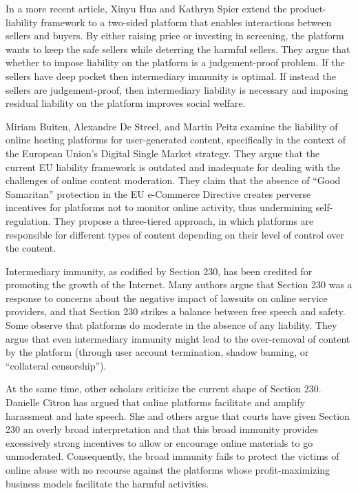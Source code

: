 In a more recent article, Xinyu Hua and Kathryn Spier extend the product-liability framework to a two-sided platform that enables interactions between sellers and buyers. By either raising price or investing in screening, the platform wants to keep the safe sellers while deterring the harmful sellers. They argue that whether to impose liability on the platform is a judgement-proof problem. If the sellers have deep pocket then intermediary immunity is optimal. If instead the sellers are judgement-proof, then intermediary liability is necessary and imposing residual liability on the platform improves social welfare.


Miriam Buiten, Alexandre De Streel, and Martin Peitz examine the liability of online hosting platforms for user-generated content, specifically in the context of the European Union's Digital Single Market strategy. They argue that the current EU liability framework is outdated and inadequate for dealing with the challenges of online content moderation. They claim that the absence of ``Good Samaritan'' protection in the EU e-Commerce Directive creates perverse incentives for platforms not to monitor online activity, thus undermining self-regulation. They propose a three-tiered approach, in which platforms are responsible for different types of content depending on their level of control over the content. 

Intermediary immunity, as codified by Section 230, has been credited for promoting the growth of the Internet. Many authors argue that Section 230 was a response to concerns about the negative impact of lawsuits on online service providers, and that Section 230 strikes a balance between free speech and safety.
Some observe that platforms do moderate in the absence of any liability. They argue that even intermediary immunity might lead to the over-removal of content by the platform (through user account termination, shadow banning, or ``collateral censorship'').

At the same time, other scholars criticize the current shape of Section 230. Danielle Citron has argued that online platforms facilitate and amplify harassment and hate speech. She and others argue that courts have given Section 230 an overly broad interpretation and that this broad immunity provides excessively strong incentives to allow or encourage online materials to go unmoderated. Consequently, the broad immunity fails to protect the victims of online abuse with no recourse against the platforms whose profit-maximizing business models facilitate the harmful activities.


